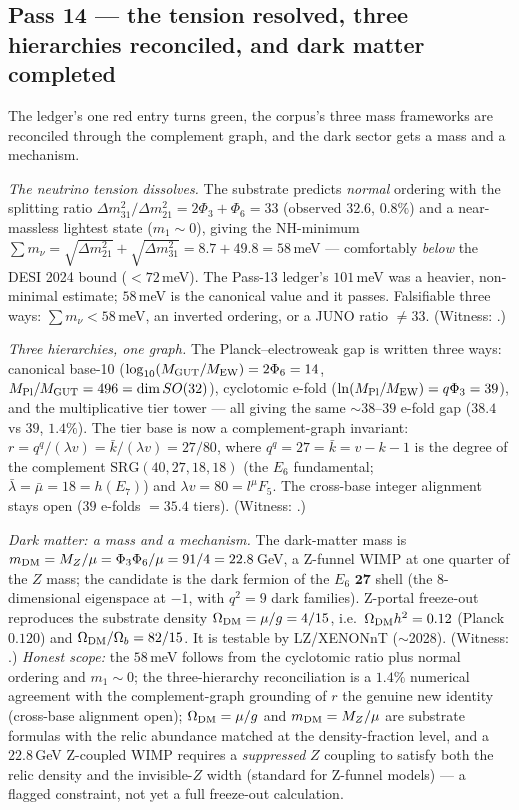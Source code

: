 \documentclass[11pt]{article}
\begin{document}
\subsection{Pass 14 --- the tension resolved, three hierarchies reconciled, and dark matter completed}
\label{sec:capstone-fourteen}

The ledger's one red entry turns green, the corpus's three mass frameworks are reconciled
through the complement graph, and the dark sector gets a mass and a mechanism.

\emph{The neutrino tension dissolves.} The substrate predicts \emph{normal} ordering with
the splitting ratio $\Delta m^2_{31}/\Delta m^2_{21}=2\Phi_3+\Phi_6=33$ (observed $32.6$,
$0.8\%$) and a near-massless lightest state ($m_1\sim0$), giving the NH-minimum
$\sum m_\nu=\sqrt{\Delta m^2_{21}}+\sqrt{\Delta m^2_{31}}=8.7+49.8=58$\,meV --- comfortably
\emph{below} the DESI 2024 bound ($<72$\,meV). The Pass-13 ledger's $101$\,meV was a
heavier, non-minimal estimate; $58$\,meV is the canonical value and it passes. Falsifiable
three ways: $\sum m_\nu<58$\,meV, an inverted ordering, or a JUNO ratio $\ne33$. (Witness:
.)

\emph{Three hierarchies, one graph.} The Planck--electroweak gap is written three ways:
canonical base-10 ($\log_{10}(M_{\rm GUT}/M_{\rm EW})=2\Phi_6=14$, $M_{\rm Pl}/M_{\rm GUT}=
496=\dim SO(32)$), cyclotomic e-fold ($\ln(M_{\rm Pl}/M_{\rm EW})=q\Phi_3=39$), and the
multiplicative tier tower --- all giving the same $\sim38$--$39$ e-fold gap ($38.4$ vs $39$,
$1.4\%$). The tier base is now a complement-graph invariant: $r=q^q/(\lambda v)=\bar
k/(\lambda v)=27/80$, where $q^q=27=\bar k=v-k-1$ is the degree of the complement
$\mathrm{SRG}(40,27,18,18)$ (the $E_6$ fundamental; $\bar\lambda=\bar\mu=18=h(E_7)$) and
$\lambda v=80=l^\mu F_5$. The cross-base integer alignment stays open ($39$ e-folds $=35.4$
tiers). (Witness: .)

\emph{Dark matter: a mass and a mechanism.} The dark-matter mass is $m_{\rm DM}=M_Z/\mu=
\Phi_3\Phi_6/\mu=91/4=22.8$\,GeV, a Z-funnel WIMP at one quarter of the $Z$ mass; the
candidate is the dark fermion of the $E_6$ $\mathbf{27}$ shell (the $8$-dimensional
eigenspace at $-1$, with $q^2=9$ dark families). Z-portal freeze-out reproduces the
substrate density $\Omega_{\rm DM}=\mu/g=4/15$, i.e.\ $\Omega_{\rm DM}h^2=0.12$ (Planck
$0.120$) and $\Omega_{\rm DM}/\Omega_b=82/15$. It is testable by LZ/XENONnT ($\sim$2028).
(Witness: .) \emph{Honest scope:} the $58$\,meV follows
from the cyclotomic ratio plus normal ordering and $m_1\sim0$; the three-hierarchy
reconciliation is a $1.4\%$ numerical agreement with the complement-graph grounding of $r$
the genuine new identity (cross-base alignment open); $\Omega_{\rm DM}=\mu/g$ and $m_{\rm DM}
=M_Z/\mu$ are substrate formulas with the relic abundance matched at the density-fraction
level, and a $22.8$\,GeV Z-coupled WIMP requires a \emph{suppressed} $Z$ coupling to satisfy
both the relic density and the invisible-$Z$ width (standard for Z-funnel models) --- a
flagged constraint, not yet a full freeze-out calculation.
\end{document}
